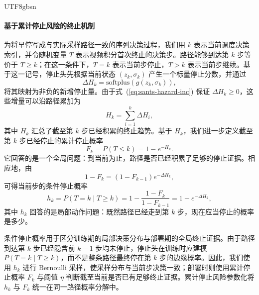\documentclass{article}
\begin{document}
\begin{CJK*}{UTF8}{gbsn}
\paragraph{基于累计停止风险的终止机制}
为将早停写成与实际采样路径一致的序列决策过程，我们用 \(k\) 表示当前调度决策索引，并令随机变量 \(T\) 表示视频积分首次终止的决策步。路径能够到达第 \(k\) 步等价于 \(T\ge k\)；在这一条件下，\(T=k\) 表示当前步停止，\(T>k\) 表示当前步继续。基于这一记号，停止头先根据当前状态 \((z_k,\sigma_k)\) 产生一个标量停止分数，并通过
\begin{equation}
\Delta H_k = \mathrm{softplus}(g(z_k,\sigma_k)),
\label{eq:sants-hazard-inc}
\end{equation}
将其映射为非负的新增停止量。由于式~(\ref{eq:sants-hazard-inc}) 保证 \(\Delta H_k\ge 0\)，这些增量可以沿路径累加为
\begin{equation}
H_k = \sum_{i=1}^{k}\Delta H_i,
\label{eq:sants-hazard-cum}
\end{equation}
其中 \(H_k\) 汇总了截至第 \(k\) 步已经积累的终止趋势。基于 \(H_k\)，我们进一步定义截至第 \(k\) 步已经停止的累计停止概率
\begin{equation}
F_k = P(T\le k) = 1-e^{-H_k}.
\label{eq:sants-stop-cdf}
\end{equation}
它回答的是一个全局问题：到当前为止，路径是否已经积累了足够的停止证据。相应地，由
\begin{equation}
1-F_k = (1-F_{k-1})e^{-\Delta H_k},
\label{eq:sants-stop-rec}
\end{equation}
可得当前步的条件停止概率
\begin{equation}
h_k = P(T=k \mid T\ge k) = 1-\frac{1-F_k}{1-F_{k-1}} = 1-e^{-\Delta H_k},
\label{eq:sants-stop-prob}
\end{equation}
其中 \(h_k\) 回答的是局部动作问题：既然路径已经走到第 \(k\) 步，现在应当停止的概率是多少。

条件停止概率用于区分训练期的局部决策分布与部署期的全局终止证据。由于路径到达第 \(k\) 步已经隐含前 \(k-1\) 步均未停止，停止头在训练时应建模 \(P(T=k\mid T\ge k)\)，而不是整条路径最终停在第 \(k\) 步的边缘概率。因此，我们使用 \(h_k\) 进行 \(\mathrm{Bernoulli}\) 采样，使采样分布与当前步决策一致；部署时则使用累计停止概率 \(F_k\) 与阈值 \(\eta\) 判断截至当前是否已有足够终止证据。累计停止风险参数化将 \(h_k\) 与 \(F_k\) 统一在同一路径概率分解中。


\end{CJK*}
\end{document}
